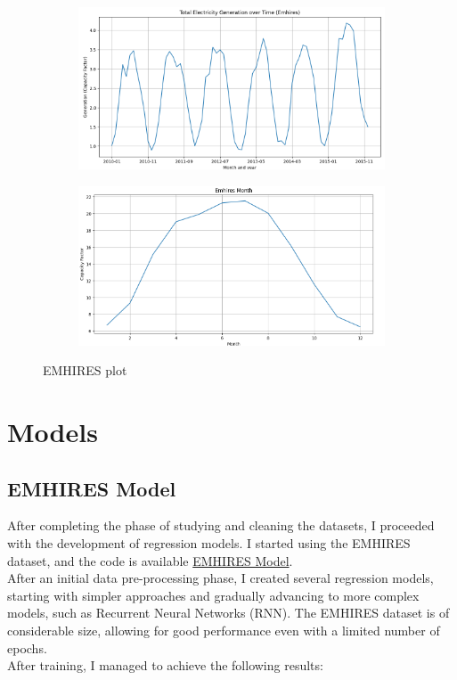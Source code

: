 \documentclass[12pt]{article}
\begin{document}
  \begin{figure}[h]
    \centering
    \begin{subfigure}{0.48\textwidth}
      \centering
      \includegraphics[width=\linewidth]{EMHIRES Graph.png}
    \end{subfigure}
    \hfill
    \begin{subfigure}{0.48\textwidth}
      \centering
      \includegraphics[width=\linewidth]{EMHIRES Graph2.png}
    \end{subfigure}
    \caption{EMHIRES plot}
    \label{fig:combined4}
\end{figure}

\clearpage
\section{Models}
\subsection{EMHIRES Model}
After completing the phase of studying and cleaning the datasets, I proceeded with the development of regression models. I started using the EMHIRES dataset, and the code is available \href{https://www.kaggle.com/code/alessandromajumba/model-emhires}{EMHIRES Model}.
\\
After an initial data pre-processing phase, I created several regression models, starting with simpler approaches and gradually advancing to more complex models, such as Recurrent Neural Networks (RNN). The EMHIRES dataset is of considerable size, allowing for good performance even with a limited number of epochs.
\\
After training, I managed to achieve the following results:
\end{document}
